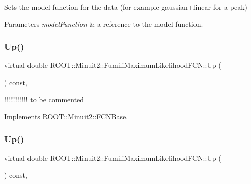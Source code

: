 Sets the model function for the data (for example gaussian+linear for a peak)


\begin{DoxyParams}{Parameters}
{\em model\+Function} & a reference to the model function. \\
\hline
\end{DoxyParams}
\mbox{\label{classROOT_1_1Minuit2_1_1FumiliMaximumLikelihoodFCN_ab945da701895bfba143da08f76ba2d05}} 
\subsubsection{\texorpdfstring{Up()}{Up()}\hspace{0.1cm}{\footnotesize\ttfamily [1/2]}}
{\footnotesize\ttfamily virtual double R\+O\+O\+T\+::\+Minuit2\+::\+Fumili\+Maximum\+Likelihood\+F\+C\+N\+::\+Up (\begin{DoxyParamCaption}{ }\end{DoxyParamCaption}) const\hspace{0.3cm}{\ttfamily [inline]}, {\ttfamily [virtual]}}

!!!!!!!!!!!! to be commented 

Implements \mbox{\hyperlink{classROOT_1_1Minuit2_1_1FCNBase_a04ef08ddad92ce8d89d498efbe021c39}{R\+O\+O\+T\+::\+Minuit2\+::\+F\+C\+N\+Base}}.

\mbox{\label{classROOT_1_1Minuit2_1_1FumiliMaximumLikelihoodFCN_ab945da701895bfba143da08f76ba2d05}} 
\subsubsection{\texorpdfstring{Up()}{Up()}\hspace{0.1cm}{\footnotesize\ttfamily [2/2]}}
{\footnotesize\ttfamily virtual double R\+O\+O\+T\+::\+Minuit2\+::\+Fumili\+Maximum\+Likelihood\+F\+C\+N\+::\+Up (\begin{DoxyParamCaption}{ }\end{DoxyParamCaption}) const\hspace{0.3cm}{\ttfamily [inline]}, {\ttfamily [virtual]}}

